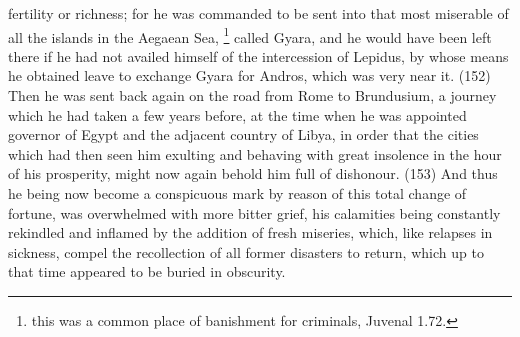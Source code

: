 fertility or richness; for he was commanded to be sent into that most miserable of all the islands in
the Aegaean Sea, \footnote{this was a common place of banishment for criminals, Juvenal 1.72.} called Gyara, and he
would have been left there if he had not availed himself of the intercession of Lepidus, by whose
means he obtained leave to exchange Gyara for Andros, which was very near it. (152) Then he
was sent back again on the road from Rome to Brundusium, a journey which he had taken a few
years before, at the time when he was appointed governor of Egypt and the adjacent country of
Libya, in order that the cities which had then seen him exulting and behaving with great insolence in
the hour of his prosperity, might now again behold him full of dishonour. (153) And thus he being
now become a conspicuous mark by reason of this total change of fortune, was overwhelmed with
more bitter grief, his calamities being constantly rekindled and inflamed by the addition of fresh
miseries, which, like relapses in sickness, compel the recollection of all former disasters to return,
which up to that time appeared to be buried in obscurity.

